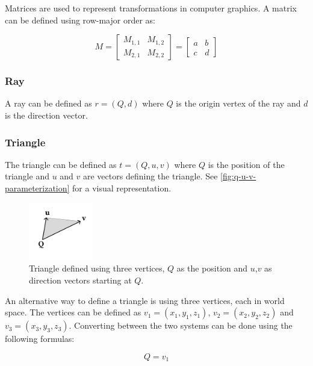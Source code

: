 Matrices are used to represent transformations in computer graphics. A matrix can be defined using row-major order as:

\begin{equation}
  \label{eqn:matrix}
  M = \begin{bmatrix} M_{1,1} & M_{1,2} \\ M_{2,1} & M_{2,2} \end{bmatrix} = \begin{bmatrix} a & b \\ c & d \end{bmatrix}
\end{equation}

\subsubsection{Ray}

A ray can be defined as $r = (Q, d)$ where $Q$ is the origin vertex of the ray and $d$ is the direction vector.

\subsubsection{Triangle}

The triangle can be defined as $t = (Q, u, v)$ where $Q$ is the position of the triangle and $u$ and $v$ are vectors defining the triangle. See \autoref{fig:q-u-v-parameterization} for a visual representation.

\begin{figure}[H]
  \centering
  \includegraphics[width=0.25\textwidth]{resources/q-u-v-parameterization.png}
  \caption{Triangle defined using three vertices, $Q$ as the position and $u$,$v$ as direction vectors starting at $Q$.}
  \label{fig:q-u-v-parameterization}
\end{figure}

An alternative way to define a triangle is using three vertices, each in world space. The vertices can be defined as $v_1 = (x_1, y_1, z_1)$, $v_2 = (x_2, y_2, z_2)$ and $v_3 = (x_3, y_3, z_3)$. Converting between the two systems can be done using the following formulas:

\begin{equation}
  \label{eqn:triangle-vertices-to-q-u-v}
  Q = v_1
\end{equation}

